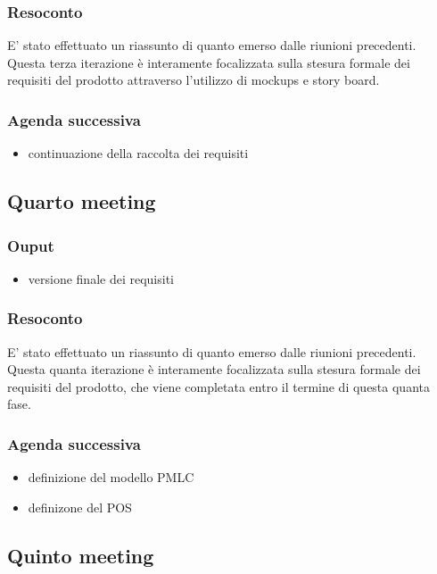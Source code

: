 \subsubsection*{Resoconto}
E' stato effettuato un riassunto di quanto emerso dalle riunioni precedenti.
Questa terza iterazione è interamente focalizzata sulla stesura formale dei requisiti del prodotto attraverso l'utilizzo di mockups e story board.
\subsubsection*{Agenda successiva}
\begin{itemize}
    \item continuazione della raccolta dei requisiti
\end{itemize} 



\subsection*{Quarto meeting}
\subsubsection*{Ouput}
\begin{itemize}
    \item versione finale dei requisiti
\end{itemize} 
\subsubsection*{Resoconto}
E' stato effettuato un riassunto di quanto emerso dalle riunioni precedenti.
Questa quanta iterazione è interamente focalizzata sulla stesura formale dei requisiti del prodotto, 
che viene completata entro il termine di questa quanta fase.  
\subsubsection*{Agenda successiva}
\begin{itemize}
    \item definizione del modello PMLC
    \item definizone del POS
\end{itemize} 



\subsection*{Quinto meeting}
